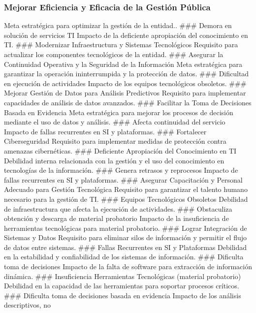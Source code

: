 \documentclass[
	a4paper, %
	12pt, %
]{include/CSSullivanBusinessReport}
\begin{document}
\subsubsection{Mejorar Eficiencia y Eficacia de la Gestión
Pública}\label{sec:mejorar-eficiencia-y-eficacia-de-la-gestiuxf3n-puxfablica}

Meta estratégica para optimizar la gestión de la entidad.. \#\#\# Demora
en solución de servicios TI Impacto de la deficiente apropiación del
conocimiento en TI. \#\#\# Modernizar Infraestructura y Sistemas
Tecnológicos Requisito para actualizar los componentes tecnológicos de
la entidad. \#\#\# Asegurar la Continuidad Operativa y la Seguridad de
la Información Meta estratégica para garantizar la operación
ininterrumpida y la protección de datos. \#\#\# Dificultad en ejecución
de actividades Impacto de los equipos tecnológicos obsoletos. \#\#\#
Mejorar Gestión de Datos para Análisis Predictivos Requisito para
implementar capacidades de análisis de datos avanzados. \#\#\# Facilitar
la Toma de Decisiones Basada en Evidencia Meta estratégica para mejorar
los procesos de decisión mediante el uso de datos y análisis. \#\#\#
Afecta continuidad del servicio Impacto de fallas recurrentes en SI y
plataformas. \#\#\# Fortalecer Ciberseguridad Requisito para implementar
medidas de protección contra amenazas cibernéticas. \#\#\# Deficiente
Apropiación del Conocimiento en TI Debilidad interna relacionada con la
gestión y el uso del conocimiento en tecnologías de la información.
\#\#\# Genera retrasos y reprocesos Impacto de fallas recurrentes en SI
y plataformas. \#\#\# Asegurar Capacitación y Personal Adecuado para
Gestión Tecnológica Requisito para garantizar el talento humano
necesario para la gestión de TI. \#\#\# Equipos Tecnológicos Obsoletos
Debilidad de infraestructura que afecta la ejecución de actividades.
\#\#\# Obstaculiza obtención y descarga de material probatorio Impacto
de la insuficiencia de herramientas tecnológicas para material
probatorio. \#\#\# Lograr Integración de Sistemas y Datos Requisito para
eliminar silos de información y permitir el flujo de datos entre
sistemas. \#\#\# Fallas Recurrentes en SI y Plataformas Debilidad en la
estabilidad y confiabilidad de los sistemas de información. \#\#\#
Dificulta toma de decisiones Impacto de la falta de software para
extracción de información dinámica. \#\#\# Insuficiencia Herramientas
Tecnológicas (material probatorio) Debilidad en la capacidad de las
herramientas para soportar procesos críticos. \#\#\# Dificulta toma de
decisiones basada en evidencia Impacto de los análisis descriptivos, no
\end{document}
